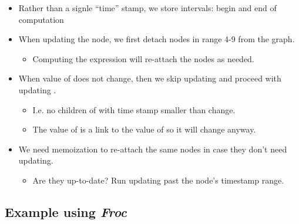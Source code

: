 \documentclass{beamer}
\newcommand{\tmem}[1]{{\em #1\/}}
\newcommand{\tmverbatim}[1]{\text{{\ttfamily{#1}}}}
\begin{document}
\begin{itemize}
  \item Rather than a signle ``time'' stamp, we store intervals: begin and end
  of computation
  
  
  \item When updating the \tmverbatim{y} node, we first detach nodes in range
  4-9 from the graph.
  \begin{itemize}
    \item Computing the expression will re-attach the nodes as needed.
  \end{itemize}
  \item When value of \tmverbatim{b} does not change, then we skip updating
  \tmverbatim{y} and proceed with updating \tmverbatim{n0}.
  \begin{itemize}
    \item I.e. no children of \tmverbatim{y} with time stamp smaller than
    \tmverbatim{y} change.
    
    \item The value of \tmverbatim{y} is a link to the value of
    \tmverbatim{n0} so it will change anyway.
  \end{itemize}
  \item We need memoization to re-attach the same nodes in case they don't
  need updating.
  \begin{itemize}
    \item Are they up-to-date? Run updating past the node's timestamp range.
  \end{itemize}
\end{itemize}

\subsection{Example using {\tmem{Froc}}}
\end{document}
